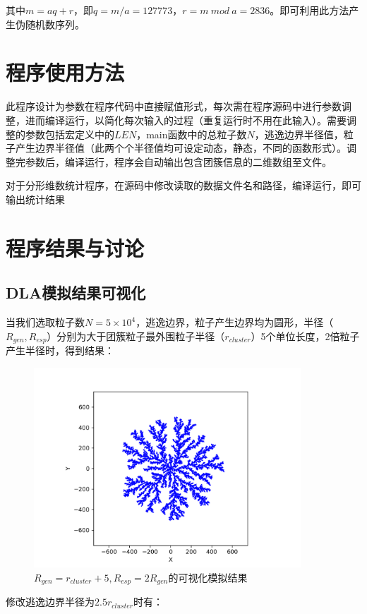 \documentclass[a4paper,11pt]{article}
\begin{document}
其中$m=aq+r$，即$q=m/a=127773$，$r=m \ mod \ a=2836$。即可利用此方法产生伪随机数序列。


\section{程序使用方法}
此程序设计为参数在程序代码中直接赋值形式，每次需在程序源码中进行参数调整，进而编译运行，以简化每次输入的过程（重复运行时不用在此输入）。需要调整的参数包括宏定义中的$LEN$，main函数中的总粒子数$N$，逃逸边界半径值，粒子产生边界半径值（此两个个半径值均可设定动态，静态，不同的函数形式）。调整完参数后，编译运行，程序会自动输出包含团簇信息的二维数组至文件。

对于分形维数统计程序，在源码中修改读取的数据文件名和路径，编译运行，即可输出统计结果



\section{程序结果与讨论}
\subsection{DLA模拟结果可视化}
当我们选取粒子数$N=5\times 10^{4}$，逃逸边界，粒子产生边界均为圆形，半径（$R_{gen},R_{esp}$）分别为大于团簇粒子最外围粒子半径（$r_{cluster}$）5个单位长度，2倍粒子产生半径时，得到结果：

\begin{figure}[!htbp]      
\centering
\includegraphics[width = 10cm]{改变max/1500-5*104-5-2*min.png}    
\caption{$R_{gen} = r_{cluster} + 5, R_{esp} = 2R_{gen}$的可视化模拟结果}    
\end{figure}

\newpage 修改逃逸边界半径为$2.5r_{cluster}$时有：
\end{document}
